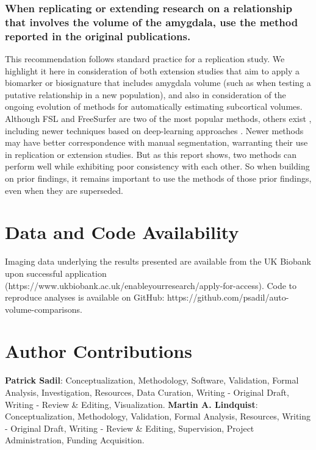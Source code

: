 \documentclass[
  authoryear,
  preprint,
  1p]{elsarticle}
\begin{document}
\subsubsection{When replicating or extending research on a relationship
that involves the volume of the amygdala, use the method reported in the
original
publications.}\label{when-replicating-or-extending-research-on-a-relationship-that-involves-the-volume-of-the-amygdala-use-the-method-reported-in-the-original-publications.}

This recommendation follows standard practice for a replication study.
We highlight it here in consideration of both extension studies that aim
to apply a biomarker or biosignature that includes amygdala volume (such
as when testing a putative relationship in a new population), and also
in consideration of the ongoing evolution of methods for automatically
estimating subcortical volumes. Although FSL and FreeSurfer are two of
the most popular methods, others exist \citep[e.g.,][]{akhondi-asl2013},
including newer techniques based on deep-learning approaches
\citetext{\citealp[e.g.,][]{billot2023}; \citealp[for review,
see][]{singh2021}}. Newer methods may have better correspondence with
manual segmentation, warranting their use in replication or extension
studies. But as this report shows, two methods can perform well while
exhibiting poor consistency with each other. So when building on prior
findings, it remains important to use the methods of those prior
findings, even when they are superseded.

\section*{Data and Code Availability}\label{data-and-code-availability}

Imaging data underlying the results presented are available from the UK
Biobank upon successful application
(https://www.ukbiobank.ac.uk/enableyourresearch/apply-for-access). Code
to reproduce analyses is available on GitHub:
https://github.com/psadil/auto-volume-comparisons.

\section*{Author Contributions}\label{author-contributions}

\textbf{Patrick Sadil}: Conceptualization, Methodology, Software,
Validation, Formal Analysis, Investigation, Resources, Data Curation,
Writing - Original Draft, Writing - Review \& Editing, Visualization.
\textbf{Martin A. Lindquist}: Conceptualization, Methodology,
Validation, Formal Analysis, Resources, Writing - Original Draft,
Writing - Review \& Editing, Supervision, Project Administration,
Funding Acquisition.
\end{document}
